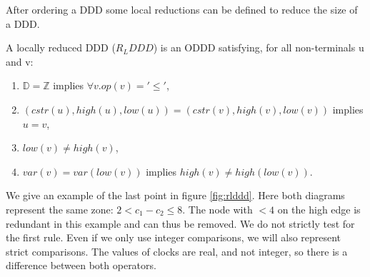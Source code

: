 After ordering a DDD some local reductions can be defined to reduce the size of a DDD.

\begin{mydef}
\label{def:RLDDD}
A locally reduced DDD ($R_LDDD$) is an ODDD satisfying, for all non-terminals u and v:
\begin{enumerate}
  \item $\mathbb{D} = \mathbb{Z}$ implies $\forall v. op(v) = '\leq'$,
  \item $(cstr(u),high(u),low(u)) = (cstr(v),high(v),low(v))$ implies $u = v$,
  \item $low(v) \neq high(v)$,
  \item $var(v) = var(low(v))$ implies $high(v) \neq high(low(v))$.
\end{enumerate}
\end{mydef}

We give an example of the last point in figure \ref{fig:rlddd}. Here both diagrams represent the same zone: $2 < c_1 - c_2 \leq 8$. The node with $< 4$ on the high edge is redundant in this example and can thus be removed. We do not strictly test for the first rule. Even if we only use integer comparisons, we will also represent strict comparisons. The values of clocks are real, and not integer, so there is a difference between both operators.

